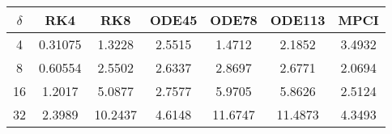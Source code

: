 \begin{tabular}{ccccccc}
\hline
$\delta$ & RK4 & RK8 & ODE45 & ODE78 & ODE113 & MPCI \\ 
\hline 
4 & 0.31075 & 1.3228 & 2.5515 & 1.4712 & 2.1852 & 3.4932\\ 
8 & 0.60554 & 2.5502 & 2.6337 & 2.8697 & 2.6771 & 2.0694\\ 
16 & 1.2017 & 5.0877 & 2.7577 & 5.9705 & 5.8626 & 2.5124\\ 
32 & 2.3989 & 10.2437 & 4.6148 & 11.6747 & 11.4873 & 4.3493\\ 
\hline 
\end{tabular}